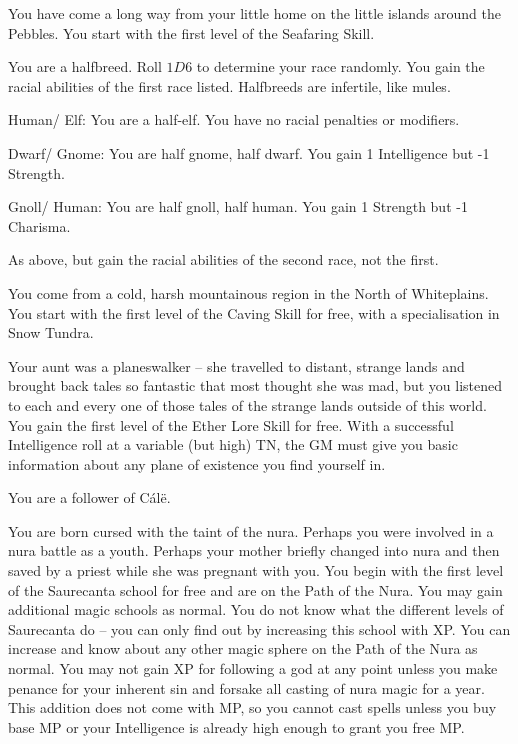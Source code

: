 \begin{multicols}{2}
\begin{list}{\addtocounter{list}{1}\textbf{:}}{\raggedleft}
  \item
  You have come a long way from your little home on the little islands around the Pebbles.  You start with the first level of the Seafaring Skill.

  \item
  You are a halfbreed.
  Roll $1D6$ to determine your race randomly.
  You gain the racial abilities of the first race listed.
  Halfbreeds are infertile, like mules.

    \setcounter{enc}{1}
    \begin{list}{\addtocounter{enc}{1}-\addtocounter{enc}{1}:}{}
      \item
      Human/ Elf: You are a half-elf.  You have no racial penalties or modifiers.

      \item
      Dwarf/ Gnome: You are half gnome, half dwarf.  You gain 1 Intelligence but -1 Strength.

      \item
      Gnoll/ Human: You are half gnoll, half human.  You gain 1 Strength but -1 Charisma.
    \end{list}

  \item
  As above, but gain the racial abilities of the second race, not the first.

  \item
  You come from a cold, harsh mountainous region in the North of Whiteplains.
  You start with the first level of the Caving Skill for free, with a specialisation in Snow Tundra.

  \item
  Your aunt was a planeswalker -- she travelled to distant, strange lands and brought back tales so fantastic that most thought she was mad, but you listened to each and every one of those tales of the strange lands outside of this world.
  You gain the first level of the Ether Lore Skill for free.
  With a successful Intelligence roll at a variable (but high) TN, the GM must give you basic information about any plane of existence you find yourself in.

  You are a follower of C\'al\"e.

  \item
  You are born cursed with the taint of the nura.
  Perhaps you were involved in a nura battle as a youth.
  Perhaps your mother briefly changed into nura and then saved by a priest while she was pregnant with you.
  You begin with the first level of the Saurecanta school for free and are on the Path of the Nura.
  You may gain additional magic schools as normal.
  You do not know what the different levels of Saurecanta do -- you can only find out by increasing this school with XP.
  You can increase and know about any other magic sphere on the Path of the Nura as normal.
  You may not gain XP for following a god at any point unless you make penance for your inherent sin and forsake all casting of nura magic for a year.
  This addition does not come with MP, so you cannot cast spells unless you buy base MP or your Intelligence is already high enough to grant you free MP.


\end{list}
\end{multicols}
